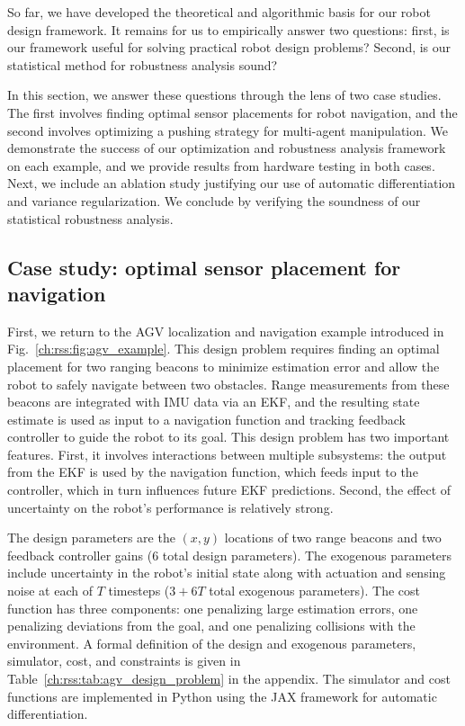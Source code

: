 So far, we have developed the theoretical and algorithmic basis for our robot design framework. It remains for us to empirically answer two questions: first, is our framework useful for solving practical robot design problems? Second, is our statistical method for robustness analysis sound?

In this section, we answer these questions through the lens of two case studies. The first involves finding optimal sensor placements for robot navigation, and the second involves optimizing a pushing strategy for multi-agent manipulation. We demonstrate the success of our optimization and robustness analysis framework on each example, and we provide results from hardware testing in both cases. Next, we include an ablation study justifying our use of automatic differentiation and variance regularization. We conclude by verifying the soundness of our statistical robustness analysis.

\subsection{Case study: optimal sensor placement for navigation}\label{ch:rss:case1}

First, we return to the AGV localization and navigation example introduced in Fig.~\ref{ch:rss:fig:agv_example}. This design problem requires finding an optimal placement for two ranging beacons to minimize estimation error and allow the robot to safely navigate between two obstacles. Range measurements from these beacons are integrated with IMU data via an EKF, and the resulting state estimate is used as input to a navigation function and tracking feedback controller to guide the robot to its goal. This design problem has two important features. First, it involves interactions between multiple subsystems: the output from the EKF is used by the navigation function, which feeds input to the controller, which in turn influences future EKF predictions. Second, the effect of uncertainty on the robot's performance is relatively strong.

The design parameters are the $(x, y)$ locations of two range beacons and two feedback controller gains (6 total design parameters). The exogenous parameters include uncertainty in the robot's initial state along with actuation and sensing noise at each of $T$ timesteps ($3 + 6T$ total exogenous parameters). The cost function has three components: one penalizing large estimation errors, one penalizing deviations from the goal, and one penalizing collisions with the environment. A formal definition of the design and exogenous parameters, simulator, cost, and constraints is given in Table~\ref{ch:rss:tab:agv_design_problem} in the appendix. The simulator and cost functions are implemented in Python using the JAX framework for automatic differentiation.

